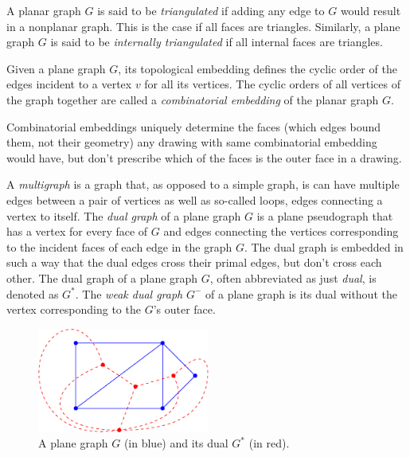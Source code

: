 \begin{definition}
A planar graph $G$ is said to be \emph{triangulated} if adding any edge to $G$ would result in a nonplanar graph.
This is the case if all faces are triangles.
Similarly, a plane graph $G$ is said to be \emph{internally triangulated} if all internal faces are triangles.
\end{definition}

\begin{definition}
Given a plane graph $G$, its topological embedding defines the cyclic order of the edges incident to a vertex $v$ for all its vertices.
The cyclic orders of all vertices of the graph together are called a \emph{combinatorial embedding} of the planar graph $G$.
\end{definition}

Combinatorial embeddings uniquely determine the faces (which edges bound them, not their geometry) any drawing with same combinatorial embedding would have, but don't prescribe which of the faces is the outer face in a drawing.

\begin{definition}
A \emph{multigraph} is a graph that, as opposed to a simple graph, is can have multiple edges between a pair of vertices as well as so-called loops, \ie{} edges connecting a vertex to itself.
The \emph{dual graph} of a plane graph $G$ is a plane pseudograph that has a vertex for every face of $G$ and edges connecting the vertices corresponding to the incident faces of each edge in the graph $G$.
The dual graph is embedded in such a way that the dual edges cross their primal edges, but don't cross each other.
The dual graph of a plane graph $G$, often abbreviated as just \emph{dual}, is denoted as $G^*$.
The \emph{weak dual graph} $G^-$ of a plane graph is its dual without the vertex corresponding to the $G$'s outer face\cite{fleischner1974}.
\end{definition}

\begin{figure}[H]
	\centering\includegraphics[height=130px]{Resources/Preliminaries-Dual.pdf}
	\caption{A plane graph $G$ (in blue) and its dual $G^*$ (in red).}
	\label{fig:preliminaries-dual}
\end{figure}

